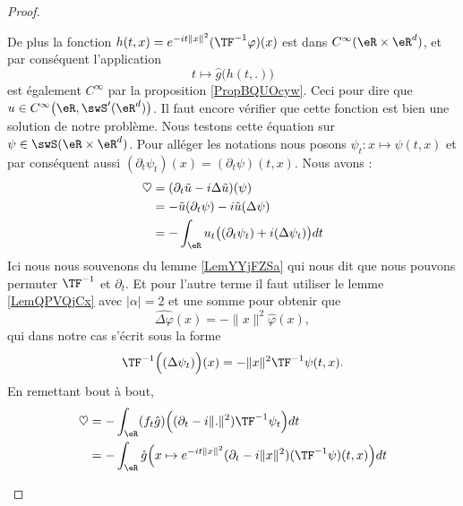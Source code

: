 \begin{proof}
\begin{subproof}
        De plus la fonction \( h(t,x)= e^{-it\| x \|^2}(\TF^{-1}\varphi)(x)\) est dans \(  C^{\infty}(\eR\times \eR^d)\), et par conséquent l'application
        \begin{equation}
            t\mapsto \hat g\big( h(t,.) \big)
        \end{equation}
        est également \(  C^{\infty}\) par la proposition \ref{PropBQUOcyw}. Ceci pour dire que \( u\in C^{\infty}\big( \eR,\swS'(\eR^d) \big)\). Il faut encore vérifier que cette fonction est bien une solution de notre problème. Nous testons cette équation sur \( \psi\in\swS(\eR\times\eR^d)\). Pour alléger les notations nous posons \( \psi_t\colon x\mapsto \psi(t,x)\) et par conséquent aussi \( (\partial_t\psi_t)(x)=(\partial_t\psi)(t,x)\). Nous avons :
        \begin{subequations}
            \begin{align}
                \heartsuit&=(\partial_t\tilde u-i\Delta\tilde u)(\psi)\\
                &=-\tilde u(\partial_t\psi)-i\tilde u(\Delta\psi)\\
                &=-\int_{\eR}u_t\big( (\partial_t\psi_t)+i(\Delta\psi_t) \big)dt
            \end{align}
        \end{subequations}
        Ici nous nous souvenons du lemme \ref{LemYYjFZSa} qui nous dit que nous pouvons permuter \( \TF^{-1}\) et \( \partial_t\). Et pour l'autre terme il faut utiliser le lemme \ref{LemQPVQjCx} avec \( | \alpha |=2\) et une somme pour obtenir que
        \begin{equation}
            \widehat{\Delta\varphi}(x)=-\| x \|^2\hat\varphi(x),
        \end{equation}
        qui dans notre cas s'écrit sous la forme
        \begin{equation}
            \TF^{-1}\Big( (\Delta\psi_t) \Big)(x)=-\| x \|^2\TF^{-1}\psi(t,x).
        \end{equation}
        En remettant bout à bout,
        \begin{subequations}
            \begin{align}
                \heartsuit&=-\int_{\eR}(f_t\hat g)\Big( (\partial_t-i\| . \|^2)\TF^{-1}\psi_t \Big)dt\\
                &=-\int_{\eR}\hat g\Big( x\mapsto  e^{-it\| x \|^2}(\partial_t-i\| x \|^2)(\TF^{-1}\psi)(t,x) \Big)dt
            \end{align}
        \end{subequations}

\end{subproof}
\end{proof}
